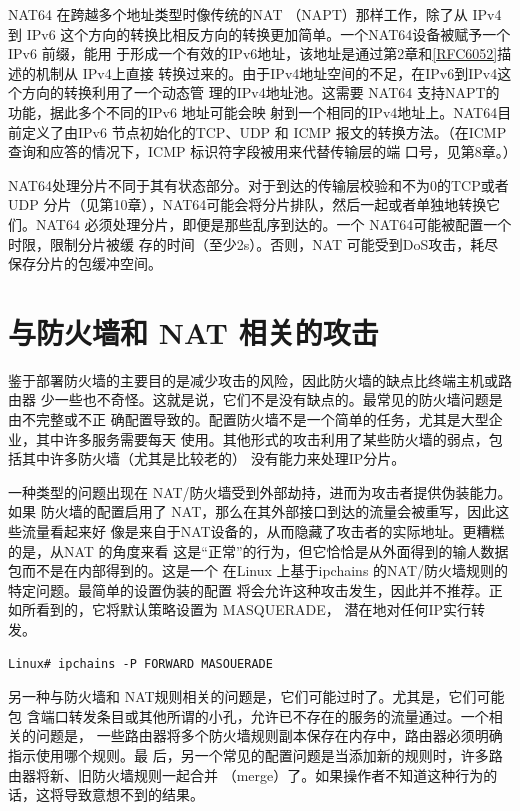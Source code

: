 NAT64 在跨越多个地址类型时像传统的NAT （NAPT）那样工作，除了从 IPv4到 IPv6
这个方向的转换比相反方向的转换更加简单。一个NAT64设备被赋予一个 IPv6 前缀，能用
于形成一个有效的IPv6地址，该地址是通过第2章和\href{https://www.rfc-editor.org/rfc/rfc6052}{[RFC6052]}描述的机制从 IPv4上直接
转换过来的。由于IPv4地址空间的不足，在IPv6到IPv4这个方向的转换利用了一个动态管
理的IPv4地址池。这需要 NAT64 支持NAPT的功能，据此多个不同的IPv6 地址可能会映
射到一个相同的IPv4地址上。NAT64目前定义了由IPv6 节点初始化的TCP、UDP 和 ICMP
报文的转换方法。（在ICMP 查询和应答的情况下，ICMP 标识符字段被用来代替传输层的端
口号，见第8章。）

NAT64处理分片不同于其有状态部分。对于到达的传输层校验和不为0的TCP或者
UDP 分片（见第10章），NAT64可能会将分片排队，然后一起或者单独地转换它们。NAT64
必须处理分片，即便是那些乱序到达的。一个 NAT64可能被配置一个时限，限制分片被缓
存的时间（至少2s）。否则，NAT 可能受到DoS攻击，耗尽保存分片的包缓冲空间。

\section{与防火墙和 NAT 相关的攻击}

鉴于部署防火墙的主要目的是减少攻击的风险，因此防火墙的缺点比终端主机或路由器
少一些也不奇怪。这就是说，它们不是没有缺点的。最常见的防火墙问题是由不完整或不正
确配置导致的。配置防火墙不是一个简单的任务，尤其是大型企业，其中许多服务需要每天
使用。其他形式的攻击利用了某些防火墙的弱点，包括其中许多防火墙（尤其是比较老的）
没有能力来处理IP分片。

一种类型的问题出现在 NAT/防火墙受到外部劫持，进而为攻击者提供伪装能力。如果
防火墙的配置启用了 NAT，那么在其外部接口到达的流量会被重写，因此这些流量看起来好
像是来自于NAT设备的，从而隐藏了攻击者的实际地址。更糟糕的是，从NAT 的角度来看
这是“正常”的行为，但它恰恰是从外面得到的输人数据包而不是在内部得到的。这是一个
在Linux 上基于ipchains 的NAT/防火墙规则的特定问题。最简单的设置伪装的配置
将会允许这种攻击发生，因此并不推荐。正如所看到的，它将默认策略设置为 MASQUERADE，
潜在地对任何IP实行转发。

\begin{verbatim}    
Linux# ipchains -P FORWARD MASOUERADE
\end{verbatim}


另一种与防火墙和 NAT规则相关的问题是，它们可能过时了。尤其是，它们可能包
含端口转发条目或其他所谓的小孔，允许已不存在的服务的流量通过。一个相关的问题是，
一些路由器将多个防火墙规则副本保存在内存中，路由器必须明确指示使用哪个规则。最
后，另一个常见的配置问题是当添加新的规则时，许多路由器将新、旧防火墙规则一起合并
（merge）了。如果操作者不知道这种行为的话，这将导致意想不到的结果。

